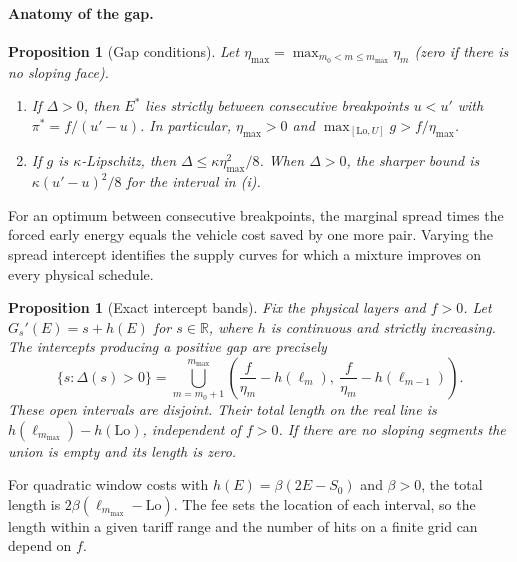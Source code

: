 \documentclass[11pt]{article}
\newtheorem{proposition}[theorem]{Proposition}
\theoremstyle{definition}\newtheorem{definition}[theorem]{Definition}
\theoremstyle{remark}\newtheorem{remark}[theorem]{Remark}
\begin{document}
\paragraph{Anatomy of the gap.}

\begin{proposition}[Gap conditions]\label{prop:anatomy}
Let $\eta_{\max}=\max_{m_0<m\le m_{\max}}\eta_m$ (zero if there is no sloping
face).
\begin{enumerate}[label=(\roman*),itemsep=1pt]
\item If $\Delta>0$, then $E^*$ lies strictly between consecutive breakpoints
$u<u'$ with $\pi^*=f/(u'-u)$. In particular, $\eta_{\max}>0$ and
$\max_{[\mathrm{Lo},U]}g>f/\eta_{\max}$.
\item If $g$ is $\kappa$-Lipschitz, then $\Delta\le\kappa\eta_{\max}^2/8$.
When $\Delta>0$, the sharper bound is $\kappa(u'-u)^2/8$ for the interval in (i).
\end{enumerate}
\end{proposition}

For an optimum between consecutive breakpoints, the marginal spread times
the forced early energy equals the vehicle cost saved by one more pair.
Varying the spread intercept identifies the supply curves for which a mixture
improves on every physical schedule.

\begin{proposition}[Exact intercept bands]\label{prop:bands}
Fix the physical layers and $f>0$. Let $G_s'(E)=s+h(E)$ for $s\in\mathbb R$,
where $h$ is continuous and strictly increasing. The intercepts producing a
positive gap are precisely
\begin{equation}\label{eq:interceptbands}
 \{s:\Delta(s)>0\}=
 \bigcup_{m=m_0+1}^{m_{\max}}
 \left(\frac{f}{\eta_m}-h(\ell_m),\
       \frac{f}{\eta_m}-h(\ell_{m-1})\right).
\end{equation}
These open intervals are disjoint. Their total length on the real line is
$h(\ell_{m_{\max}})-h(\mathrm{Lo})$, independent of $f>0$. If there are no
sloping segments the union is empty and its length is zero.
\end{proposition}

For quadratic window costs with $h(E)=\beta(2E-S_0)$ and $\beta>0$, the total
length is $2\beta(\ell_{m_{\max}}-\mathrm{Lo})$. The fee sets the location
of each interval, so the length within a given tariff range and the number of
hits on a finite grid can depend on $f$.
\end{document}
